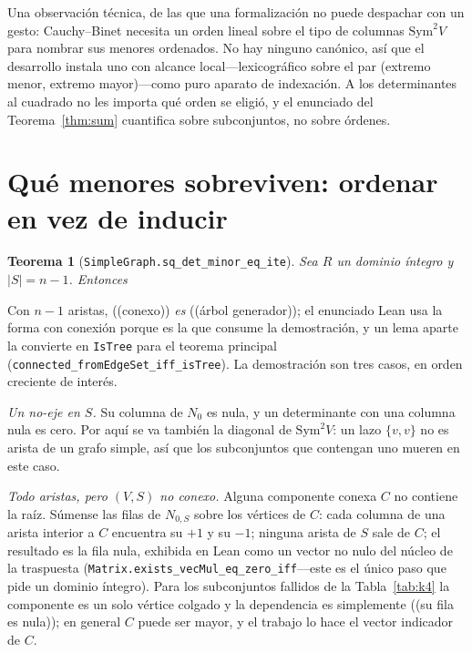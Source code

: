 \documentclass[11pt]{article}
\newtheorem{theorem}{Teorema}
\newcommand{\lean}[1]{\texttt{#1}}
\newcommand{\keyeq}[1]{\begin{center}\keybox{$\displaystyle #1$}\end{center}}
\begin{document}
Una observaci\'on t\'ecnica, de las que una formalizaci\'on no puede despachar con un gesto:
Cauchy--Binet necesita un orden lineal sobre el tipo de columnas $\mathrm{Sym}^2V$ para nombrar
sus menores ordenados. No hay ninguno can\'onico, as\'i que el desarrollo instala uno con
alcance local---lexicogr\'afico sobre el par (extremo menor, extremo mayor)---como puro aparato
de indexaci\'on. A los determinantes al cuadrado no les importa qu\'e orden se eligi\'o, y el
enunciado del Teorema~\ref{thm:sum} cuantifica sobre subconjuntos, no sobre \'ordenes.

\section{Qu\'e menores sobreviven: ordenar en vez de inducir}
\label{sec:dichotomy}

\begin{theorem}[{\lean{SimpleGraph.sq\_det\_minor\_eq\_ite}}]
\label{thm:dichotomy}
Sea $R$ un dominio \'integro y $|S|=n-1$. Entonces
\keyeq{\bigl(\det N_{0,S}\bigr)^2\;=\;
\begin{cases}
  1 & \text{si } S\subseteq E(G)\ \text{y}\ (V,S)\ \text{es conexo,}\\[2pt]
  0 & \text{en caso contrario.}
\end{cases}}
\end{theorem}

Con $n-1$ aristas, ((conexo)) \emph{es} ((\'arbol generador)); el enunciado Lean usa la forma
con conexi\'on porque es la que consume la demostraci\'on, y un lema aparte la convierte en
\lean{IsTree} para el teorema principal (\lean{connected\_fromEdgeSet\_iff\_isTree}). La
demostraci\'on son tres casos, en orden creciente de inter\'es.

\emph{Un no-eje en $S$.} Su columna de $N_0$ es nula, y un determinante con una columna nula es
cero. Por aqu\'i se va tambi\'en la diagonal de $\mathrm{Sym}^2V$: un lazo $\{v,v\}$ no es
arista de un grafo simple, as\'i que los subconjuntos que contengan uno mueren en este caso.

\emph{Todo aristas, pero $(V,S)$ no conexo.} Alguna componente conexa $C$ no contiene la
ra\'iz. S\'umense las filas de $N_{0,S}$ sobre los v\'ertices de $C$: cada columna de una
arista interior a $C$ encuentra su $+1$ y su $-1$; ninguna arista de $S$ sale de $C$; el
resultado es la fila nula, exhibida en Lean como un vector no nulo del n\'ucleo de la
traspuesta (\lean{Matrix.exists\_vecMul\_eq\_zero\_iff}---este es el \'unico paso que pide un
dominio \'integro). Para los subconjuntos fallidos de la Tabla~\ref{tab:k4} la componente es un
solo v\'ertice colgado y la dependencia es simplemente ((su fila es nula)); en general $C$
puede ser mayor, y el trabajo lo hace el vector indicador de $C$.
\end{document}
